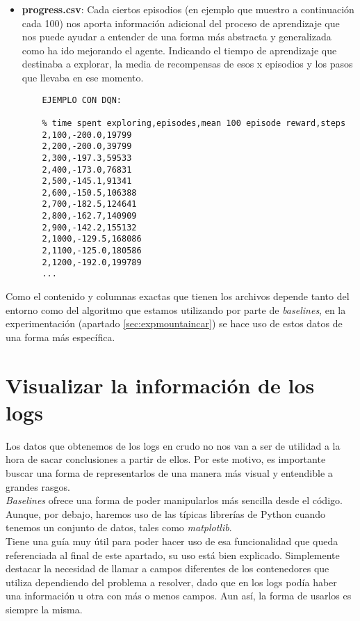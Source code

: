\documentclass[11pt,fleqn]{book} %
\begin{document}
\begin{itemize}
	\item \textbf{progress.csv}: Cada ciertos episodios (en ejemplo que muestro a continuación cada 100) nos aporta información adicional del proceso de aprendizaje que nos puede ayudar a entender de una forma más abstracta y generalizada como ha ido mejorando el agente. Indicando el tiempo de aprendizaje que destinaba a explorar, la media de recompensas de esos x episodios y los pasos que llevaba en ese momento.\\
	
	
	\begin{verbatim}
	EJEMPLO CON DQN:
	
	% time spent exploring,episodes,mean 100 episode reward,steps
	2,100,-200.0,19799
	2,200,-200.0,39799
	2,300,-197.3,59533
	2,400,-173.0,76831
	2,500,-145.1,91341
	2,600,-150.5,106388
	2,700,-182.5,124641
	2,800,-162.7,140909
	2,900,-142.2,155132
	2,1000,-129.5,168086
	2,1100,-125.0,180586
	2,1200,-192.0,199789
	...
	\end{verbatim}
\end{itemize}

Como el contenido y columnas exactas que tienen los archivos depende tanto del entorno como del algoritmo que estamos utilizando por parte de \textit{baselines}, en la experimentación (apartado \ref{sec:expmountaincar}) se hace uso de estos datos de una forma más específica.

\section{Visualizar la información de los logs}\label{sec:visualizarlogs}

Los datos que obtenemos de los logs en crudo no nos van a ser de utilidad a la hora de sacar conclusiones a partir de ellos. Por este motivo, es importante buscar una forma de representarlos de una manera más visual y entendible a grandes rasgos. \\

\textit{Baselines} ofrece una forma de poder manipularlos más sencilla desde el código. Aunque, por debajo, haremos uso de las típicas librerías de Python cuando tenemos un conjunto de datos, tales como \textit{matplotlib}. \\

Tiene una guía muy útil para poder hacer uso de esa funcionalidad que queda referenciada al final de este apartado, su uso está bien explicado. Simplemente destacar la necesidad de llamar a campos diferentes de los contenedores que utiliza dependiendo del problema a resolver, dado que en los logs podía haber una información u otra con más o menos campos. Aun así, la forma de usarlos es siempre la misma.\cite{article:plot} \\
\end{document}
